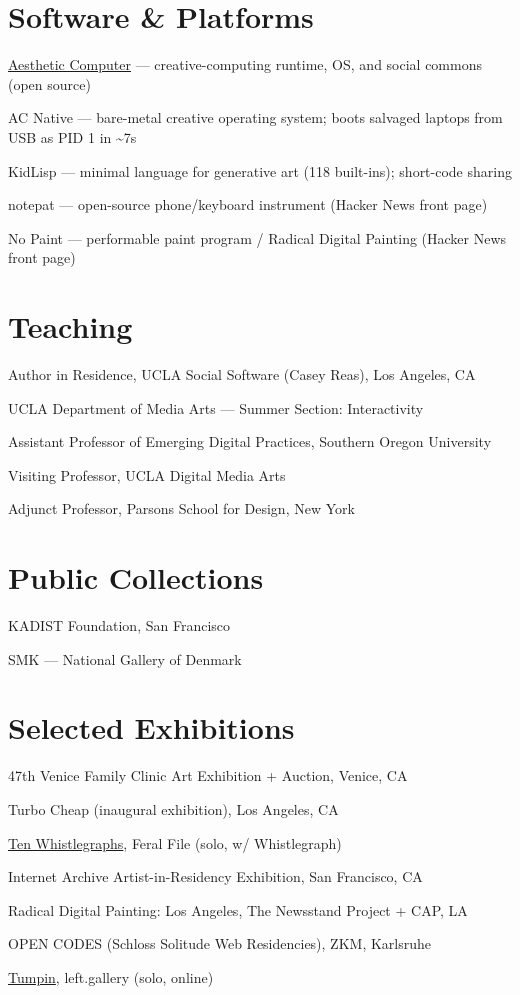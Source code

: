 \documentclass[10pt,letterpaper]{article}
\newlength{\cvyearwidth}
\newenvironment{cvlist}{%
  \begin{list}{}{%
    \setlength{\leftmargin}{\cvyearwidth}%
    \setlength{\labelwidth}{\cvyearwidth}%
    \setlength{\labelsep}{0.4em}%
    \setlength{\itemsep}{0.08em}%
    \setlength{\parsep}{0pt}%
    \setlength{\topsep}{0.15em}%
    \renewcommand{\makelabel}[1]{\color{acgray}\small ##1\hfill}%
  }%
}{\end{list}}
\newcommand{\cv}[2]{\item[#1] #2}
\begin{document}
\section*{Software \& Platforms}
\begin{cvlist}
  \cv{2021--}{\href{https://aesthetic.computer}{Aesthetic Computer} --- creative-computing runtime, OS, and social commons (open source)}
  \cv{2025--}{AC Native --- bare-metal creative operating system; boots salvaged laptops from USB as PID 1 in \textasciitilde7s}
  \cv{2024--}{KidLisp --- minimal language for generative art (118 built-ins); short-code sharing}
  \cv{2024--}{notepat --- open-source phone/keyboard instrument (Hacker News front page)}
  \cv{2016--}{No Paint --- performable paint program / Radical Digital Painting (Hacker News front page)}
\end{cvlist}

\section*{Teaching}
\begin{cvlist}
  \cv{2026}{Author in Residence, UCLA Social Software (Casey Reas), Los Angeles, CA}
  \cv{2024}{UCLA Department of Media Arts --- Summer Section: Interactivity}
  \cv{2019}{Assistant Professor of Emerging Digital Practices, Southern Oregon University}
  \cv{2016}{Visiting Professor, UCLA Digital Media Arts}
  \cv{2013--16}{Adjunct Professor, Parsons School for Design, New York}
\end{cvlist}

\section*{Public Collections}
\begin{cvlist}
  \cv{}{KADIST Foundation, San Francisco}
  \cv{}{SMK --- National Gallery of Denmark}
\end{cvlist}

\section*{Selected Exhibitions}
\begin{cvlist}
  \cv{2026}{47th Venice Family Clinic Art Exhibition + Auction, Venice, CA}
  \cv{2025}{Turbo Cheap (inaugural exhibition), Los Angeles, CA}
  \cv{2022}{\href{https://feralfile.com/exhibitions/ten-whistlegraphs-thv}{Ten Whistlegraphs}, Feral File (solo, w/ Whistlegraph)}
  \cv{2019}{Internet Archive Artist-in-Residency Exhibition, San Francisco, CA}
  \cv{2018}{Radical Digital Painting: Los Angeles, The Newsstand Project + CAP, LA}
  \cv{2018}{OPEN CODES (Schloss Solitude Web Residencies), ZKM, Karlsruhe}
  \cv{2017}{\href{https://left.gallery/tumpin}{Tumpin}, left.gallery (solo, online)}
\end{cvlist}
\end{document}
